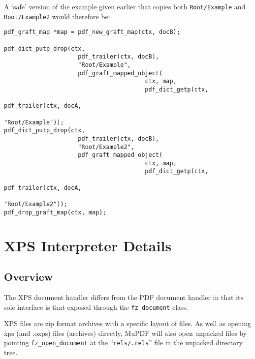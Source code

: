 \documentclass[oneside]{book}
\begin{document}
A `safe' version of the example given earlier that copies both \texttt{Root/Example} and \texttt{Root/Example2} would therefore be:

\begin{lstlisting}
pdf_graft_map *map = pdf_new_graft_map(ctx, docB);

pdf_dict_putp_drop(ctx,
                     pdf_trailer(ctx, docB),
                     "Root/Example",
                     pdf_graft_mapped_object(
                                        ctx, map,
                                        pdf_dict_getp(ctx,
                                                        pdf_trailer(ctx, docA,
                                                        "Root/Example")); 
pdf_dict_putp_drop(ctx,
                     pdf_trailer(ctx, docB),
                     "Root/Example2",
                     pdf_graft_mapped_object(
                                        ctx, map,
                                        pdf_dict_getp(ctx,
                                                        pdf_trailer(ctx, docA,
                                                        "Root/Example2"));
pdf_drop_graft_map(ctx, map); 
\end{lstlisting}





\chapter{XPS Interpreter Details}
\label{XPSInterpreter}

\section{Overview}

The XPS document handler differs from the PDF document handler in that its sole interface is that exposed through the \texttt{fz\_document} class.

XPS files are zip format archives with a specific layout of files. As well as opening xps (and .oxps) files (archives) directly, MuPDF will also open unpacked files by pointing \texttt{fz\_open\_document} at the ``\texttt{rels/.rels}'' file in the unpacked directory tree.
\end{document}
